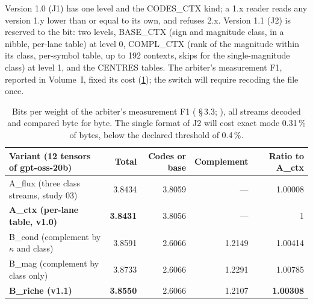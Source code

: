 Version 1.0 (J1) has one level and the CODES\_CTX kind; a 1.x reader reads any version 1.y lower than or equal to its own, and refuses 2.x. Version 1.1 (J2) is reserved to the bit: two levels, BASE\_CTX (sign and magnitude class, in a nibble, per-lane table) at level 0, COMPL\_CTX (rank of the magnitude within its class, per-symbol table, up to 192 contexts, skips for the single-magnitude class) at level 1, and the CENTRES tables. The arbiter's measurement F1, reported in Volume~I, fixed its cost (\cref{t2fmt:tab:fun}); the switch will require recoding the file once.

\begin{table}[ht]
\centering\small
\begin{tabular}{l r r r r}
\toprule
Variant (12 tensors of gpt-oss-20b) & Total & Codes or base & Complement & Ratio to A\_ctx \\
\midrule
A\_flux (three class streams, study 03) & 3.8434 & 3.8059 & — & 1.00008 \\
\textbf{A\_ctx (per-lane table, v1.0)} & \textbf{3.8431} & 3.8056 & — & 1 \\
B\_cond (complement by $\kappa$ and class) & 3.8591 & 2.6066 & 1.2149 & 1.00414 \\
B\_mag (complement by class only) & 3.8733 & 2.6066 & 1.2291 & 1.00785 \\
\textbf{B\_riche (v1.1)} & \textbf{3.8550} & 2.6066 & 1.2107 & \textbf{1.00308} \\
\bottomrule
\end{tabular}
\caption[What the v1.1 split costs]{Bits per weight of the arbiter's measurement F1 ( §\,3.3; ), all streams decoded and compared byte for byte. The single format of J2 will cost exact mode 0.31\,\% of bytes, below the declared threshold of 0.4\,\%.}
\label{t2fmt:tab:fun}
\end{table}

